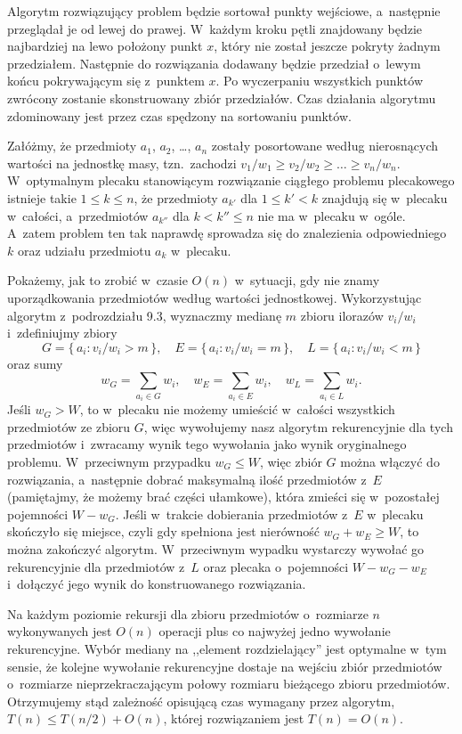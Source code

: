 Algorytm rozwiązujący problem będzie sortował punkty wejściowe, a~następnie przeglądał je od lewej do prawej.
W~każdym kroku pętli znajdowany będzie najbardziej na lewo położony punkt $x$, który nie został jeszcze pokryty żadnym przedziałem.
Następnie do rozwiązania dodawany będzie przedział o~lewym końcu pokrywającym się z~punktem $x$.
Po wyczerpaniu wszystkich punktów zwrócony zostanie skonstruowany zbiór przedziałów.
Czas działania algorytmu zdominowany jest przez czas spędzony na sortowaniu punktów.

\exercise %
Załóżmy, że przedmioty $a_1$, $a_2$, \dots, $a_n$ zostały posortowane według nierosnących wartości na jednostkę masy, tzn.\ zachodzi $v_1/w_1\ge v_2/w_2\ge\dots\ge v_n/w_n$.
W~optymalnym plecaku stanowiącym rozwiązanie ciągłego problemu plecakowego istnieje takie $1\le k\le n$, że przedmioty $a_{k'}$ dla $1\le k'<k$ znajdują się w~plecaku w~całości, a~przedmiotów $a_{k''}$ dla $k<k''\le n$ nie ma w~plecaku w~ogóle.
A~zatem problem ten tak naprawdę sprowadza się do znalezienia odpowiedniego $k$ oraz udziału przedmiotu $a_k$ w~plecaku.

Pokażemy, jak to zrobić w~czasie $O(n)$ w~sytuacji, gdy nie znamy uporządkowania przedmiotów według wartości jednostkowej.
Wykorzystując algorytm  z~podrozdziału 9.3, wyznaczmy medianę $m$ zbioru ilorazów $v_i/w_i$ i~zdefiniujmy zbiory
\[
	G = \{\,a_i:v_i/w_i>m\,\}, \quad E = \{\,a_i:v_i/w_i=m\,\}, \quad L = \{\,a_i:v_i/w_i<m\,\}
\]
oraz sumy
\[
	w_G = \sum_{a_i\in G}w_i, \quad w_E = \sum_{a_i\in E}w_i, \quad w_L = \sum_{a_i\in L}w_i.
\]
Jeśli $w_G>W$, to w~plecaku nie możemy umieścić w~całości wszystkich przedmiotów ze zbioru $G$, więc wywołujemy nasz algorytm rekurencyjnie dla tych przedmiotów i~zwracamy wynik tego wywołania jako wynik oryginalnego problemu.
W~przeciwnym przypadku $w_G\le W$, więc zbiór $G$ można włączyć do rozwiązania, a~następnie dobrać maksymalną ilość przedmiotów z~$E$ (pamiętajmy, że możemy brać części ułamkowe), która zmieści się w~pozostałej pojemności $W-w_G$.
Jeśli w~trakcie dobierania przedmiotów z~$E$ w~plecaku skończyło się miejsce, czyli gdy spełniona jest nierówność $w_G+w_E\ge W$, to można zakończyć algorytm.
W~przeciwnym wypadku wystarczy wywołać go rekurencyjnie dla przedmiotów z~$L$ oraz plecaka o~pojemności $W-w_G-w_E$ i~dołączyć jego wynik do konstruowanego rozwiązania.

Na każdym poziomie rekursji dla zbioru przedmiotów o~rozmiarze $n$ wykonywanych jest $O(n)$ operacji plus co najwyżej jedno wywołanie rekurencyjne.
Wybór mediany na ,,element rozdzielający'' jest optymalne w~tym sensie, że kolejne wywołanie rekurencyjne dostaje na wejściu zbiór przedmiotów o~rozmiarze nieprzekraczającym połowy rozmiaru bieżącego zbioru przedmiotów.
Otrzymujemy stąd zależność opisującą czas wymagany przez algorytm, $T(n)\le T(n/2)+O(n)$, której rozwiązaniem jest $T(n)=O(n)$.

